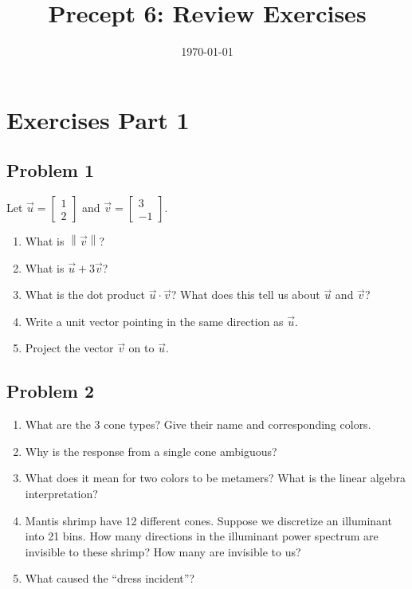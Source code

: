 \documentclass[11pt]{article}
\title{Precept 6: Review Exercises}
\date{\today}
\begin{document}
\maketitle
\thispagestyle{fancy}

\section*{Exercises Part 1}
\subsection*{Problem 1}
Let $\vec{u}=\begin{bmatrix}
    1\\ 2
\end{bmatrix}$ and $\vec{v}=\begin{bmatrix}
    3\\ -1
\end{bmatrix}$.
\begin{enumerate}
    \item[(a)] What is $\left\|\vec{v}\right\|$?
    \item[(b)] What is $\vec{u}+3\vec{v}$?
    \item[(c)] What is the dot product $\vec{u}\cdot \vec{v}$? What does this tell us about $\vec{u}$ and $\vec{v}$?
    \item[(d)] Write a unit vector pointing in the same direction as $\vec{u}$.
    \item[(e)] Project the vector $\vec{v}$ on to $\vec{u}$.
\end{enumerate}

\subsection*{Problem 2}
\begin{enumerate}
    \item[(a)] What are the 3 cone types? Give their name and corresponding colors.
    \item[(b)] Why is the response from a single cone ambiguous?
    \item[(c)] What does it mean for two colors to be metamers? What is the linear algebra interpretation?
    \item[(d)] Mantis shrimp have 12 different cones. Suppose we discretize an illuminant into 21 bins. How many directions in the illuminant power spectrum are invisible to these shrimp? How many are invisible to us?
    \item[(e)] What caused the ``dress incident''?
\end{enumerate}
\end{document}
